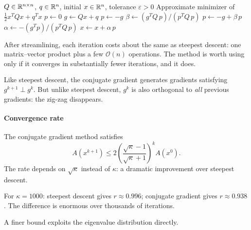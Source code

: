 \begin{algorithm}
	\caption{Conjugate Gradient for Quadratic Functions (CGQ)}
	\label{alg:CGQ}
	\begin{algorithmic}[1]
		\Require $Q \in \mathbb{R}^{n \times n}$, $q \in \mathbb{R}^n$, initial $x \in \mathbb{R}^n$, tolerance $\varepsilon > 0$
		\Ensure Approximate minimizer of $\frac{1}{2} x^T Q x + q^T x$
			\State $p \gets 0$
				\State $g \gets Qx + q$
					\State $p \gets -g$ 
				\Else
					\State $\beta \gets (g^T Q\, p) / (p^T Q\, p)$
					\State $p \gets -g + \beta\, p$ 
				\EndIf
				\State $\alpha \gets -(g^T p) / (p^T Q\, p)$
				\State $x \gets x + \alpha\, p$
			\EndWhile
		\EndProcedure
	\end{algorithmic}
\end{algorithm}

After streamlining, each iteration costs about the same as steepest descent: one matrix--vector product plus a few $\mathcal{O}(n)$ operations.
The method is worth using only if it converges in substantially fewer iterations, and it does.

Like steepest descent, the conjugate gradient generates gradients satisfying $g^{k+1} \perp g^k$.
But unlike steepest descent, $g^k$ is also orthogonal to \emph{all} previous gradients: the zig-zag disappears.

\paragraph{Convergence rate}

\begin{theorem}\label{thm:cg-conv}
	The conjugate gradient method satisfies
	\begin{equation}\label{eq:cg-rate}
		A(x^{k+1}) \leq 2 \left(\frac{\sqrt{\kappa} - 1}{\sqrt{\kappa} + 1}\right)^{\!k} A(x^0).
	\end{equation}
	The rate depends on $\sqrt{\kappa}$ instead of $\kappa$: a dramatic improvement over steepest descent.
\end{theorem}

For $\kappa = 1000$: steepest descent gives $r \approx 0.996$; conjugate gradient gives $r \approx 0.938$.
The difference is enormous over thousands of iterations.

A finer bound exploits the eigenvalue distribution directly.

